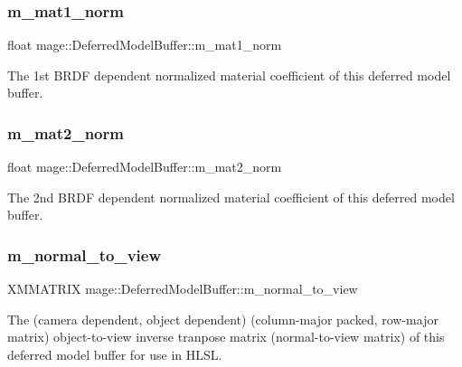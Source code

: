 \subsubsection{\texorpdfstring{m\+\_\+mat1\+\_\+norm}{m\_mat1\_norm}}
{\footnotesize\ttfamily float mage\+::\+Deferred\+Model\+Buffer\+::m\+\_\+mat1\+\_\+norm}

The 1st B\+R\+DF dependent normalized material coefficient of this deferred model buffer. \hypertarget{structmage_1_1_deferred_model_buffer_a93f058462b55a468c1a345ec0ff8bda5}{}\label{structmage_1_1_deferred_model_buffer_a93f058462b55a468c1a345ec0ff8bda5} 
\subsubsection{\texorpdfstring{m\+\_\+mat2\+\_\+norm}{m\_mat2\_norm}}
{\footnotesize\ttfamily float mage\+::\+Deferred\+Model\+Buffer\+::m\+\_\+mat2\+\_\+norm}

The 2nd B\+R\+DF dependent normalized material coefficient of this deferred model buffer. \hypertarget{structmage_1_1_deferred_model_buffer_a91287ed74cfb628f459b3ccc2e44ab2b}{}\label{structmage_1_1_deferred_model_buffer_a91287ed74cfb628f459b3ccc2e44ab2b} 
\subsubsection{\texorpdfstring{m\+\_\+normal\+\_\+to\+\_\+view}{m\_normal\_to\_view}}
{\footnotesize\ttfamily X\+M\+M\+A\+T\+R\+IX mage\+::\+Deferred\+Model\+Buffer\+::m\+\_\+normal\+\_\+to\+\_\+view}

The (camera dependent, object dependent) (column-\/major packed, row-\/major matrix) object-\/to-\/view inverse tranpose matrix (normal-\/to-\/view matrix) of this deferred model buffer for use in H\+L\+SL. \hypertarget{structmage_1_1_deferred_model_buffer_a84ee32eb54e80f19bdff68eae22177e8}{}\label{structmage_1_1_deferred_model_buffer_a84ee32eb54e80f19bdff68eae22177e8} 

